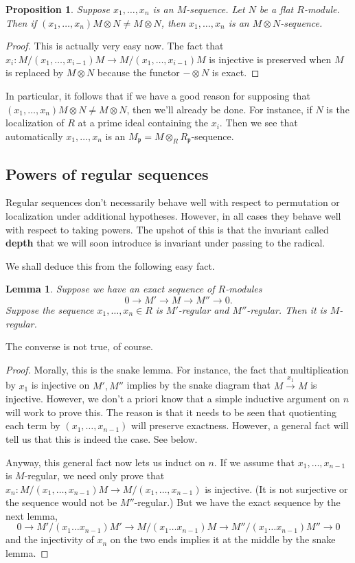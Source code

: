 \documentclass{article}
\newtheorem{lemma}{Lemma}
\newtheorem{proposition}{Proposition}
\begin{document}
\begin{proposition} 
Suppose $x_1, \dots, x_n$ is an $M$-sequence. Let $N$ be a flat $R$-module.
Then if $(x_1, \dots, x_n)M \otimes N \neq M \otimes N$, then $x_1, \dots, x_n$
is an $M \otimes N$-sequence.
\end{proposition} 
\begin{proof} 
This is actually very easy now. The fact that $x_i: M/(x_1, \dots, x_{i-1})M
\to M/(x_1, \dots, x_{i-1})M$ is injective is preserved when $M$ is replaced by
$M \otimes N$ because the functor $- \otimes N$ is exact. 
\end{proof} 

In particular, it follows that if we have a good reason for supposing that
$(x_1,\dots, x_n) M \otimes N \neq M \otimes N$, then we'll already be
done. For instance, if $N$ is the localization of $R$ at a prime ideal
containing the $x_i$. Then we see that automatically $x_1, \dots, x_n$ is an
$M_{\mathfrak{p}} = M \otimes_R R_{\mathfrak{p}}$-sequence. 

\subsection{Powers of regular sequences}

Regular sequences don't necessarily behave well with respect to permutation or
localization under additional hypotheses. However, in all cases they behave
well with respect to taking powers. The upshot of this is that the invariant
called \textbf{depth} that we will soon introduce is invariant under passing to
the radical.

We shall deduce this from the following easy fact.
\begin{lemma} 
Suppose we have an exact sequence of $R$-modules
\[  0 \to M' \to M \to M'' \to 0.  \]
Suppose the sequence $x_1, \dots, x_n \in R$ is $M'$-regular and $M''$-regular.
Then it is $M$-regular.
\end{lemma} 
The converse is not true, of course.
\begin{proof} 
Morally, this is the snake lemma. For instance, the fact that multiplication by
$x_1$ is injective on $M', M''$ implies by the snake diagram that $M
\stackrel{x_1}{\to} M$ is injective. However, we don't a priori know that a
simple inductive argument on $n$ will work to prove this. The reason is that it needs
to be seen that quotienting each term by $(x_1, \dots, x_{n-1})$ will preserve
exactness. However, a general fact will tell us that this is indeed the case.
See below.

Anyway, this general fact now lets us induct on $n$. If we assume
that $x_1, \dots, x_{n-1}$ is $M$-regular, we need only prove that $x_{n}:
M/(x_1, \dots, x_{n-1})M
\to M/(x_1, \dots, x_{n-1})$ is injective. (It is not surjective or the
sequence would not be $M''$-regular.) But we have the exact sequence by the
next lemma,
\[ 0 \to M'/(x_1 \dots x_{n-1})M' \to M/(x_1 \dots x_{n-1})M \to  M''/(x_1
\dots x_{n-1})M'' \to 0 \]
and the injectivity of $x_n$ on the two ends implies it at the middle by the
snake lemma.
\end{proof} 
\end{document}
